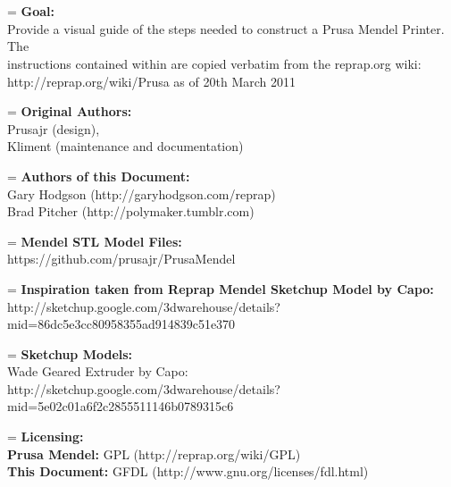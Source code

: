 \newpage
{}
{}
\chapter*{}
	\hangindent=\parindent
	\textbf{Goal:}\\
		Provide a visual guide of the steps needed to construct a Prusa Mendel Printer. The\\
		instructions contained within are copied verbatim from the reprap.org wiki:\\
		http://reprap.org/wiki/Prusa as of 20th March 2011\vspace{\baselineskip}

	\noindent
	\hangindent=\parindent
	\textbf{Original Authors:}\\
		Prusajr (design),\\
		Kliment (maintenance and documentation)\vspace{\baselineskip}
	
	\noindent
	\hangindent=\parindent
	\textbf{Authors of this Document:}\\
		Gary Hodgson (http://garyhodgson.com/reprap)\\
		Brad Pitcher (http://polymaker.tumblr.com)\vspace{\baselineskip}

	\noindent
	\hangindent=\parindent
	\textbf{Mendel STL Model Files:}\\
		https://github.com/prusajr/PrusaMendel\vspace{\baselineskip}

	\noindent
	\hangindent=\parindent
	\textbf{Inspiration taken from Reprap Mendel Sketchup Model by Capo:}\\
		http://sketchup.google.com/3dwarehouse/details?mid=86dc5e3cc80958355ad914839c51e370\vspace{\baselineskip}

	\noindent
	\hangindent=\parindent
	\textbf{Sketchup Models:}\\
		Wade Geared Extruder by Capo:\\
		http://sketchup.google.com/3dwarehouse/details?mid=5e02c01a6f2c2855511146b0789315c6\vspace{\baselineskip}

	\noindent
	\hangindent=\parindent
	\textbf{Licensing:}\\
		\textbf{Prusa Mendel:} GPL (http://reprap.org/wiki/GPL)\\
		\textbf{This Document:} GFDL (http://www.gnu.org/licenses/fdl.html)\vspace{\baselineskip}

